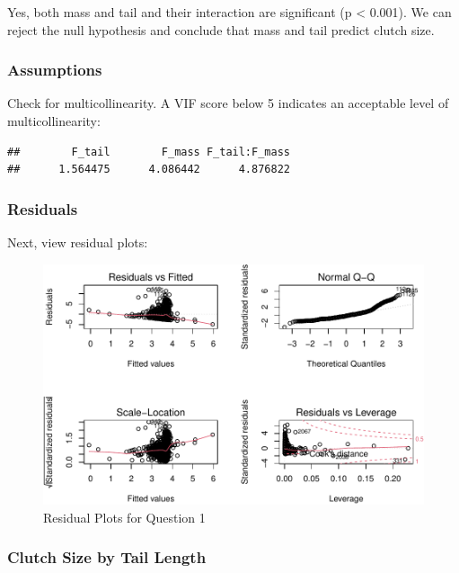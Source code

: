 \documentclass[
  12pt,
]{article}
\begin{document}
Yes, both mass and tail and their interaction are significant (p
\textless{} 0.001). We can reject the null hypothesis and conclude that
mass and tail predict clutch size.

\hypertarget{assumptions}{%
\subsubsection{Assumptions}\label{assumptions}}

Check for multicollinearity. A VIF score below 5 indicates an acceptable
level of multicollinearity:

\begin{verbatim}
##        F_tail        F_mass F_tail:F_mass 
##      1.564475      4.086442      4.876822
\end{verbatim}

\hypertarget{residuals}{%
\subsubsection{Residuals}\label{residuals}}

Next, view residual plots:

\begin{figure}
\centering
\includegraphics{Project_Code_files/figure-latex/q-1_residuals-1.pdf}
\caption{Residual Plots for Question 1}
\end{figure}

\newpage

\hypertarget{clutch-size-by-tail-length}{%
\subsubsection{Clutch Size by Tail
Length}\label{clutch-size-by-tail-length}}
\end{document}
